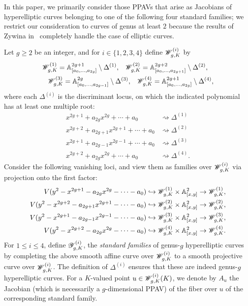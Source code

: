 In this paper, we primarily consider those PPAVs that arise as Jacobians of hyperelliptic curves belonging to one of the following four standard families; we restrict our consideration to curves of genus at least $2$ because the results of Zywina in~\cite{zywina2010hilbert} completely handle the case of elliptic curves.
\begin{definition}
	\label{definition:standard-families}
Let $g \geq 2$ be an integer, and for $i \in \{1, 2, 3, 4 \}$ define $\standardTarget g i K$ by
\begin{align*}
&\standardTarget g 1 K = \mathbb A^{2g+1}_{[a_0, \ldots, a_{2g}]} \setminus \Delta^{(1)}, \,\,\,\,\, \standardTarget g 2 K = \mathbb A^{2g+2}_{[a_0, \ldots, a_{2g+1}]}\setminus \Delta^{(2)}, \\
&\,\,\,\,\,  \standardTarget g 3 K = \mathbb A^{2g}_{[a_0, \ldots, a_{2g-1}]}\setminus \Delta^{(3)}, \,\,\,\,\,  \standardTarget g 4 K = \mathbb A^{2g+1}_{[a_0, \ldots, a_{2g}]} \setminus \Delta^{(4)}, 
\end{align*}
where each $\Delta^{(i)}$ is the discriminant locus, on which the indicated polynomial has at least one multiple root: 
\[
\begin{array}{cc}
x^{2g+1} + a_{2g}x^{2g} + \cdots + a_0  &\rightsquigarrow  \Delta^{(1)}  \\
x^{2g+2} + a_{2g+1}x^{2g+1} + \cdots + a_0 & \rightsquigarrow  \Delta^{(2)}\\
x^{2g+1} + a_{2g-1}x^{2g-1} + \cdots + a_0  &\rightsquigarrow \Delta^{(3)}\\
x^{2g+2} + a_{2g}x^{2g} + \cdots + a_0 &\rightsquigarrow \Delta^{(4)}.
\end{array}
\]
Consider the following vanishing loci, and view them as families over $\standardTarget g i K$ via projection onto the first factor:
\begin{align*}
V(y^2 - x^{2g+1} - a_{2g}x^{2g} - \cdots - a_0) &\hookrightarrow \standardTarget g 1 K \times \mathbb A^2_{[x,y]} \to \standardTarget g 1 K, \\
V(y^2 - x^{2g+2} - a_{2g+1}x^{2g+1} - \cdots - a_0) &\hookrightarrow \standardTarget g 2 K \times \mathbb A^2_{[x,y]} \to \standardTarget g 2 K,  \\
V(y^2 - x^{2g+1} - a_{2g-1}x^{2g-1} - \cdots - a_0) &\hookrightarrow \standardTarget g 3 K\times \mathbb A^2_{[x,y]} \to  \standardTarget g 3 K, \\
V(y^2 - x^{2g+2} - a_{2g}x^{2g} - \cdots - a_0) &\hookrightarrow \standardTarget g 4 K \times \mathbb A^2_{[x,y]} \to \standardTarget g 4 K.
\end{align*}
For $1 \leq i \leq 4$, define $\standardFamily g i K$, the \emph{standard families} of genus-$g$ hyperelliptic curves by completing the above smooth affine
curve over $\standardTarget g i K$ to a smooth projective curve over $\standardTarget g i K$. The definition of $\Delta^{(i)}$ ensures that these are indeed genus-$g$ hyperelliptic curves. 
For a $K$-valued point $u \in \standardTarget g i K (K)$, we denote by $A_u$ the Jacobian (which is necessarily a $g$-dimensional PPAV) of the fiber over $u$ of the corresponding standard family.
\end{definition}

